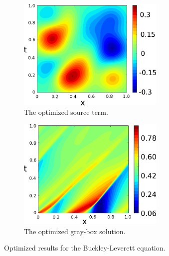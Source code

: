 \begin{figure}[htbp]\begin{center}
    \begin{subfigure}[t]{.49\textwidth}
        \centering
        \includegraphics[width=7cm]{../opt_source.png}
        \caption{The optimized source term.}
        \label{fig: opt BL source}
    \end{subfigure}
    \begin{subfigure}[t]{.49\textwidth}     
        \centering
        \includegraphics[width=7cm]{../LD_utx.png}
        \caption{The optimized gray-box solution.}
        \label{fig: opt BL sol}
    \end{subfigure}
    \caption{Optimized results for the Buckley-Leverett equation.}
    \label{fig: opt BL results}
\end{center}\end{figure}


